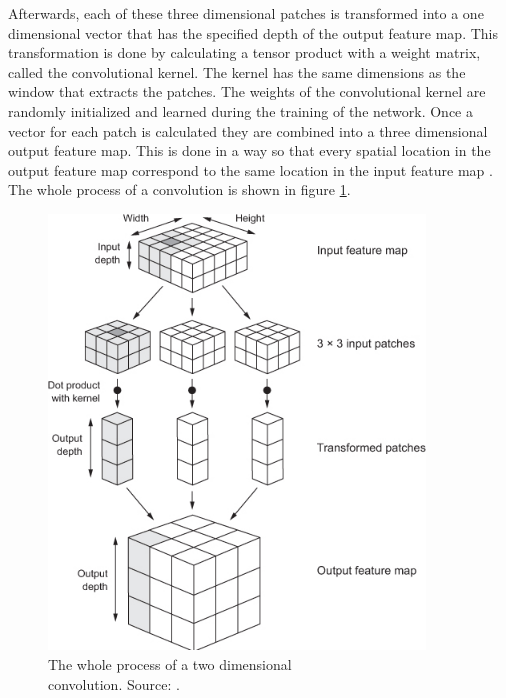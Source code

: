 Afterwards, each of these three dimensional patches is transformed into a one dimensional vector that has the specified depth of the output feature map. This transformation is done by calculating a tensor product with a weight matrix, called the convolutional kernel. The kernel has the same dimensions as the window that extracts the patches. The weights of the convolutional kernel are randomly initialized and learned during the training of the network. Once a vector for each patch is calculated they are combined into a three dimensional output feature map. This is done in a way so that every spatial location in the output feature map correspond to the same location in the input feature map \cite[Chapter~5]{cnn}. The whole process of a convolution is shown in figure \ref{fig:conv}.

\begin{figure}[H]
	\centering
	\includegraphics[width=10cm]{images/nn/conv.jpg}
	\caption[The whole process of a two dimensional convolution.]{The whole process of a two dimensional \\convolution. Source: \cite[Chapter~5]{cnn}.}
	\label{fig:conv}
\end{figure}

